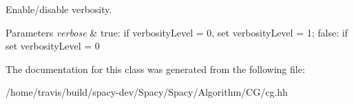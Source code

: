 \-Enable/disable verbosity. 


\begin{DoxyParams}{\-Parameters}
{\em verbose} & true\-: if verbosity\-Level = 0, set verbosity\-Level = 1; false\-: if set verbosity\-Level = 0 \\
\hline
\end{DoxyParams}


\-The documentation for this class was generated from the following file\-:\begin{DoxyCompactItemize}
\item 
/home/travis/build/spacy-\/dev/\-Spacy/\-Spacy/\-Algorithm/\-C\-G/cg.\-hh\end{DoxyCompactItemize}
